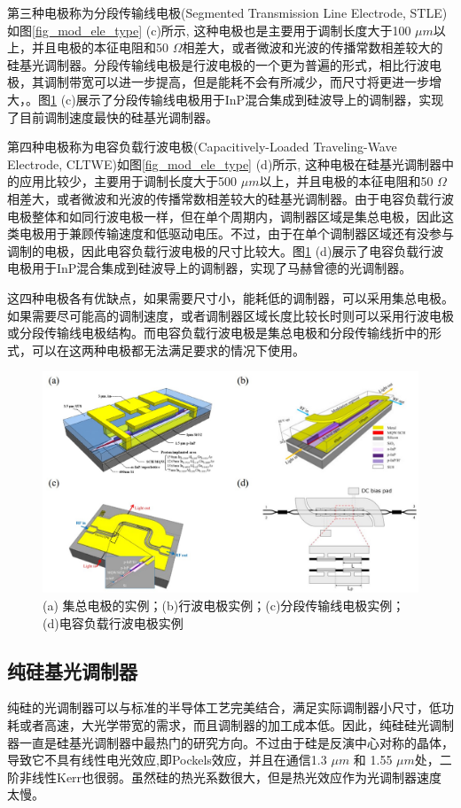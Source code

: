 第三种电极称为分段传输线电极(Segmented Transmission Line Electrode, STLE)如图\ref{fig_mod_ele_type} (c)所示, 这种电极也是主要用于调制长度大于100 $\mu m$以上，并且电极的本征电阻和50 $\Omega$相差大，或者微波和光波的传播常数相差较大的硅基光调制器。分段传输线电极是行波电极的一个更为普遍的形式，相比行波电极，其调制带宽可以进一步提高，但是能耗不会有所减少，而尺寸将更进一步增大，。图\ref{fig_mod_ele_type_real} (c)展示了分段传输线电极用于InP混合集成到硅波导上的调制器\cite{tang2012energy}，实现了目前调制速度最快的硅基光调制器。

第四种电极称为电容负载行波电极(Capacitively-Loaded Traveling-Wave Electrode, CLTWE)如图\ref{fig_mod_ele_type} (d)所示, 这种电极在硅基光调制器中的应用比较少，主要用于调制长度大于500 $\mu m$以上，并且电极的本征电阻和50 $\Omega$相差大，或者微波和光波的传播常数相差较大的硅基光调制器。由于电容负载行波电极整体和如同行波电极一样，但在单个周期内，调制器区域是集总电极，因此这类电极用于兼顾传输速度和低驱动电压。不过，由于在单个调制器区域还有没参与调制的电极，因此电容负载行波电极的尺寸比较大。图\ref{fig_mod_ele_type_real} (d)展示了电容负载行波电极用于InP混合集成到硅波导上的调制器\cite{tang2012energy}，实现了马赫曾德的光调制器。

这四种电极各有优缺点，如果需要尺寸小，能耗低的调制器，可以采用集总电极。如果需要尽可能高的调制速度，或者调制器区域长度比较长时则可以采用行波电极或分段传输线电极结构。而电容负载行波电极是集总电极和分段传输线折中的形式，可以在这两种电极都无法满足要求的情况下使用。
\begin{figure}[htb]
	\centering
	\includegraphics[width=12cm]{./Pictures/fig_mod_ele_type_real.jpg}
	\caption{ (a) 集总电极的实例\cite{tang2012energy}；(b)行波电极实例\cite{tang201150}；(c)分段传输线电极实例\cite{tang2012over}；(d)电容负载行波电极实例\cite{chen2011forty}}
	\label{fig_mod_ele_type_real}
\end{figure}
\subsection{纯硅基光调制器}
纯硅的光调制器可以与标准的半导体工艺完美结合，满足实际调制器小尺寸，低功耗或者高速，大光学带宽的需求，而且调制器的加工成本低。因此，纯硅硅光调制器一直是硅基光调制器中最热门的研究方向。不过由于硅是反演中心对称的晶体，导致它不具有线性电光效应,即Pockels效应，并且在通信1.3 $\mu m$ 和 1.55 $\mu m$处，二阶非线性Kerr也很弱\cite{soref1987electrooptical}。虽然硅的热光系数很大，但是热光效应作为光调制器速度太慢\cite{cocorullo1992thermo}。

